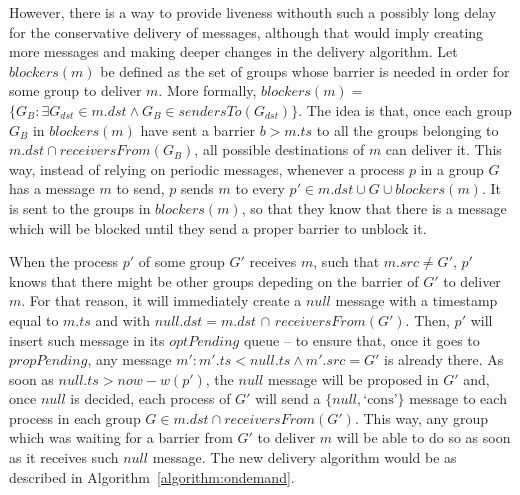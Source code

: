 \documentclass[times, 10pt]{article}
\begin{document}
However, there is a way to provide liveness withouth such a possibly long delay for the conservative delivery of messages, although that would imply creating more messages and making deeper changes in the delivery algorithm. Let $blockers(m)$ be defined as the set of groups whose barrier is needed in order for some group to deliver $m$. More formally, $blockers(m) =$ \mbox{$\{G_B : \exists G_{dst} \in m.dst \wedge G_B \in sendersTo(G_{dst})\}$}. The idea is that, once each group $G_B$ in $blockers(m)$ have sent a barrier $b > m.ts$ to all the groups belonging to \mbox{$m.dst \cap receiversFrom(G_B)$}, all possible destinations of $m$ can deliver it. This way, instead of relying on periodic messages, whenever a process $p$ in a group $G$ has a message $m$ to send, $p$ sends $m$ to every $p' \in m.dst \cup G \cup blockers(m)$. It is sent to the groups in $blockers(m)$, so that they know that there is a message which will be blocked until they send a proper barrier to unblock it.

When the process $p'$ of some group $G'$ receives $m$, such that $m.src \neq G'$, $p'$ knows that there might be other groups depeding on the barrier of $G'$ to deliver $m$. For that reason, it will immediately create a $null$ message with a timestamp equal to $m.ts$ and with $null.dst = m.dst$ $\cap$ $receiversFrom(G')$. Then, $p'$ will insert such message in its $optPending$ queue -- to ensure that, once it goes to $propPending$, any message \mbox{$m': m'.ts < null.ts \wedge m'.src = G'$} is already there. As soon as $null.ts > now - w(p')$, the $null$ message will be proposed in $G'$ and, once $null$ is decided, each process of $G'$ will send a $\{null, \text{`cons'}\}$ message to each process in each group \mbox{$G \in m.dst \cap receiversFrom(G')$}. This way, any group which was waiting for a barrier from $G'$ to deliver $m$ will be able to do so as soon as it receives such $null$ message. The new delivery algorithm would be as described in \mbox{Algorithm {\ref{algorithm:ondemand}}}.
\end{document}
